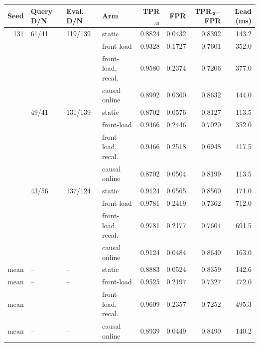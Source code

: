 \begin{tabular}{rlllrrrr}
\toprule
Seed & Query D/N & Eval. D/N & Arm & TPR$_{30}$ & FPR & TPR$_{30}$--FPR & Lead (ms) \\
\midrule
131 & 61/41 & 119/139 & static & 0.8824 & 0.0432 & 0.8392 & 143.2 \\
 &  &  & front-load & 0.9328 & 0.1727 & 0.7601 & 352.0 \\
 &  &  & front-load, recal. & 0.9580 & 0.2374 & 0.7206 & 377.0 \\
 &  &  & causal online & 0.8992 & 0.0360 & 0.8632 & 144.0 \\
\addlinespace
133 & 49/41 & 131/139 & static & 0.8702 & 0.0576 & 0.8127 & 113.5 \\
 &  &  & front-load & 0.9466 & 0.2446 & 0.7020 & 352.0 \\
 &  &  & front-load, recal. & 0.9466 & 0.2518 & 0.6948 & 417.5 \\
 &  &  & causal online & 0.8702 & 0.0504 & 0.8199 & 113.5 \\
\addlinespace
137 & 43/56 & 137/124 & static & 0.9124 & 0.0565 & 0.8560 & 171.0 \\
 &  &  & front-load & 0.9781 & 0.2419 & 0.7362 & 712.0 \\
 &  &  & front-load, recal. & 0.9781 & 0.2177 & 0.7604 & 691.5 \\
 &  &  & causal online & 0.9124 & 0.0484 & 0.8640 & 163.0 \\
\midrule
mean & -- & -- & static & 0.8883 & 0.0524 & 0.8359 & 142.6 \\
mean & -- & -- & front-load & 0.9525 & 0.2197 & 0.7327 & 472.0 \\
mean & -- & -- & front-load, recal. & 0.9609 & 0.2357 & 0.7252 & 495.3 \\
mean & -- & -- & causal online & 0.8939 & 0.0449 & 0.8490 & 140.2 \\
\bottomrule
\end{tabular}
